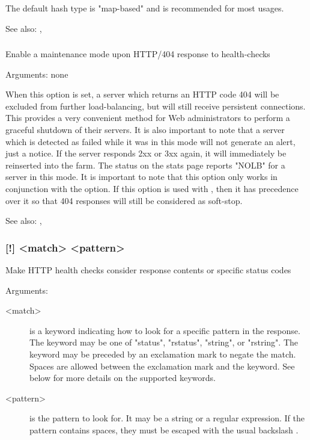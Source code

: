   The default hash type is "map-based" and is recommended for most usages.


See also: , 

\subsubsection[http-check disable-on-404]{}

  Enable a maintenance mode upon HTTP/404 response to health-checks
  
  
  Arguments: none

  When this option is set, a server which returns an HTTP code 404 will be
  excluded from further load-balancing, but will still receive persistent
  connections. This provides a very convenient method for Web administrators
  to perform a graceful shutdown of their servers. It is also important to note
  that a server which is detected as failed while it was in this mode will not
  generate an alert, just a notice. If the server responds 2xx or 3xx again, it
  will immediately be reinserted into the farm. The status on the stats page
  reports "NOLB" for a server in this mode. It is important to note that this
  option only works in conjunction with the  option. If this option
  is used with , then it has precedence over it so that 404
  responses will still be considered as soft-stop.


See also: , 

\subsubsection[http-check expect]{ [!] <match> <pattern>}

  Make HTTP health checks consider response contents or specific status codes
  
  
  Arguments:
  \begin{description}
  \item[<match>]
              is a keyword indicating how to look for a specific pattern in the
              response. The keyword may be one of "status", "rstatus",
              "string", or "rstring". The keyword may be preceded by an
              exclamation mark \chr{!} to negate the match. Spaces are allowed
              between the exclamation mark and the keyword. See below for more
              details on the supported keywords.

  \item[<pattern>] is the pattern to look for. It may be a string or a regular
              expression. If the pattern contains spaces, they must be escaped
              with the usual backslash \chr{\bslash}.
  \end{description}

